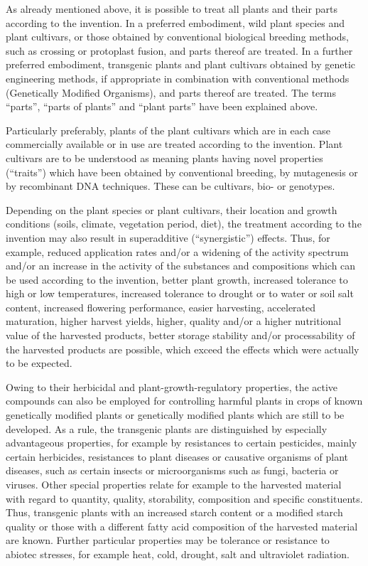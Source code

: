 \documentclass[11pt,a4paper]{article}
\begin{document}
As already mentioned above, it is possible to treat all plants and their parts according to the invention. In a preferred embodiment, wild plant species and plant cultivars, or those obtained by conventional biological breeding methods, such as crossing or protoplast fusion, and parts thereof are treated. In a further preferred embodiment, transgenic plants and plant cultivars obtained by genetic engineering methods, if appropriate in combination with conventional methods (Genetically Modified Organisms), and parts thereof are treated. The terms “parts”, “parts of plants” and “plant parts” have been explained above.

Particularly preferably, plants of the plant cultivars which are in each case commercially available or in use are treated according to the invention. Plant cultivars are to be understood as meaning plants having novel properties (“traits”) which have been obtained by conventional breeding, by mutagenesis or by recombinant DNA techniques. These can be cultivars, bio- or genotypes.

Depending on the plant species or plant cultivars, their location and growth conditions (soils, climate, vegetation period, diet), the treatment according to the invention may also result in superadditive (“synergistic”) effects. Thus, for example, reduced application rates and/or a widening of the activity spectrum and/or an increase in the activity of the substances and compositions which can be used according to the invention, better plant growth, increased tolerance to high or low temperatures, increased tolerance to drought or to water or soil salt content, increased flowering performance, easier harvesting, accelerated maturation, higher harvest yields, higher, quality and/or a higher nutritional value of the harvested products, better storage stability and/or processability of the harvested products are possible, which exceed the effects which were actually to be expected.

Owing to their herbicidal and plant-growth-regulatory properties, the active compounds can also be employed for controlling harmful plants in crops of known genetically modified plants or genetically modified plants which are still to be developed. As a rule, the transgenic plants are distinguished by especially advantageous properties, for example by resistances to certain pesticides, mainly certain herbicides, resistances to plant diseases or causative organisms of plant diseases, such as certain insects or microorganisms such as fungi, bacteria or viruses. Other special properties relate for example to the harvested material with regard to quantity, quality, storability, composition and specific constituents. Thus, transgenic plants with an increased starch content or a modified starch quality or those with a different fatty acid composition of the harvested material are known. Further particular properties may be tolerance or resistance to abiotec stresses, for example heat, cold, drought, salt and ultraviolet radiation.
\end{document}
